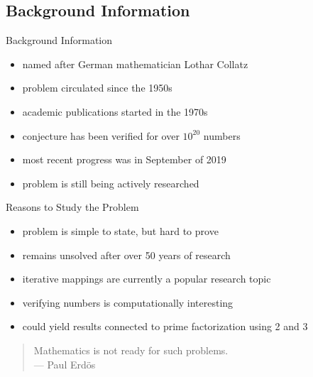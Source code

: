 \documentclass[hyperref={colorlinks,allcolors=black}]{beamer}
\begin{document}

\subsection[Background]{Background Information}

\begin{frame}{Background Information}
\begin{itemize}
    \item named after German mathematician Lothar Collatz
    \item problem circulated since the 1950s
    \item academic publications started in the 1970s \cite{src:lagarias}
    \item conjecture has been verified for over $10^{20}$ numbers
        \cite{src:tao}
    \item most recent progress was in September of 2019 \cite{src:tao}
    \item problem is still being actively researched
\end{itemize}
\end{frame}


\begin{frame}{Reasons to Study the Problem}
\begin{itemize}
    \item problem is simple to state, but hard to prove
    \item remains unsolved after over 50 years of research \cite{src:lagarias}
    \item iterative mappings are currently a popular research topic 
        \cite{src:lagarias}
    \item verifying numbers is computationally interesting 
        \cite{src:lagarias}
    \item could yield results connected to prime factorization using 2 and 3 
        \cite{src:lagarias}
\end{itemize}
\begin{quote}
Mathematics is not ready for such problems. \\ \flushright --- Paul Erdös
\end{quote}
\end{frame}

\end{document}
